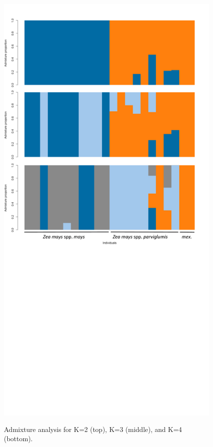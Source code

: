 \begin{figure}
\centering
\caption{Admixture analysis for K=2 (top), K=3 (middle), and K=4 (bottom).}
\includegraphics[width=\linewidth]{figures/admixture.pdf}
\label{fig:suppadmix}
\end{figure}

